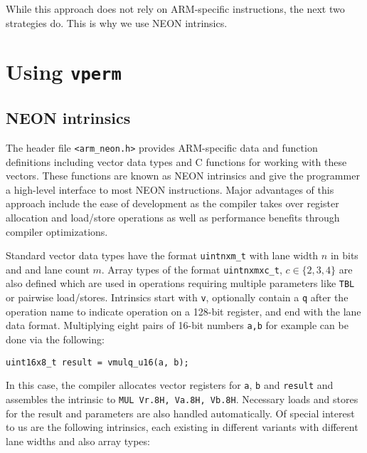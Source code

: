 While this approach does not rely on ARM-specific instructions, the next two
strategies do. This is why we use NEON intrinsics.

\section{Using \texttt{vperm}}

\subsection{NEON intrinsics}

The header file \texttt{<arm\_neon.h>} provides ARM-specific data and function
definitions including vector data types and C functions for working with these
vectors. These functions are known as NEON intrinsics and give the programmer a
high-level interface to most NEON instructions. Major advantages of this
approach include the ease of development as the compiler takes over register
allocation and load/store operations as well as performance benefits through
compiler optimizations.

Standard vector data types have the format \texttt{uintnxm\_t} with lane width
$n$ in bits and and lane count $m$. Array types of the format
\texttt{uintnxmxc\_t}, $c\in\{2,3,4\}$ are also defined which are used in
operations requiring multiple parameters like \texttt{TBL} or pairwise
load/stores. Intrinsics start with \texttt{v}, optionally contain a \texttt{q}
after the operation name to indicate operation on a 128-bit register, and end
with the lane data format. Multiplying eight pairs of 16-bit numbers
\texttt{a,b} for example can be done via the following:

\begin{center}
    \texttt{uint16x8\_t result = vmulq\_u16(a, b);}
\end{center}

In this case, the compiler allocates vector registers for \texttt{a},
\texttt{b} and \texttt{result} and assembles the intrinsic to \texttt{MUL
Vr.8H, Va.8H, Vb.8H}. Necessary loads and stores for the result and parameters
are also handled automatically. Of special interest to us are the following
intrinsics, each existing in different variants with different lane widths and
also array types: \\

